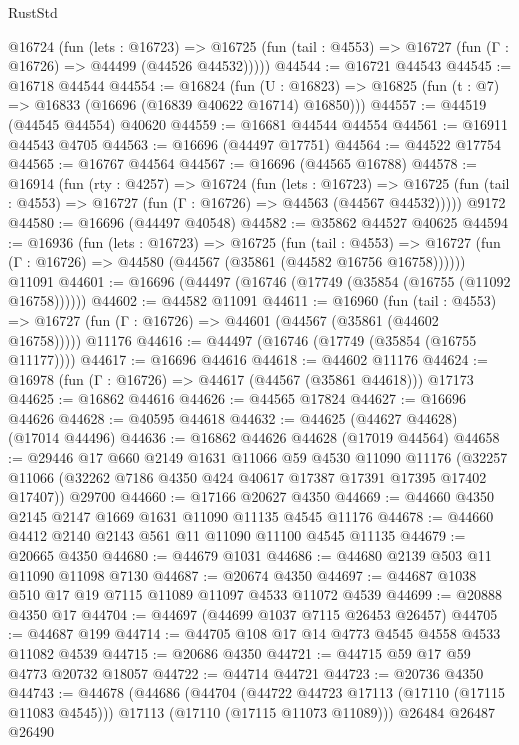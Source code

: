 \begin{lexlean}{RustStd}
\begin{coremodule}
    @16724
      (fun (lets : @16723) =>
      @16725 (fun (tail : @4553) => @16727 (fun (Γ : @16726) => @44499 (@44526 @44532)))))
@44544 := @16721 @44543
@44545 := @16718 @44544
@44554 := @16824
    (fun (U : @16823) => @16825 (fun (t : @7) => @16833 (@16696 (@16839 @40622 @16714) @16850)))
@44557 := @44519 (@44545 @44554) @40620
@44559 := @16681 @44544 @44554
@44561 := @16911 @44543 @4705
@44563 := @16696 (@44497 @17751)
@44564 := @44522 @17754
@44565 := @16767 @44564
@44567 := @16696 (@44565 @16788)
@44578 := @16914
    (fun (rty : @4257) =>
    @16724
      (fun (lets : @16723) =>
      @16725 (fun (tail : @4553) => @16727 (fun (Γ : @16726) => @44563 (@44567 @44532)))))
    @9172
@44580 := @16696 (@44497 @40548)
@44582 := @35862 @44527 @40625
@44594 := @16936
    (fun (lets : @16723) =>
    @16725
      (fun (tail : @4553) =>
      @16727 (fun (Γ : @16726) => @44580 (@44567 (@35861 (@44582 @16756 @16758))))))
    @11091
@44601 := @16696 (@44497 (@16746 (@17749 (@35854 (@16755 (@11092 @16758))))))
@44602 := @44582 @11091
@44611 := @16960
    (fun (tail : @4553) => @16727 (fun (Γ : @16726) => @44601 (@44567 (@35861 (@44602 @16758)))))
    @11176
@44616 := @44497 (@16746 (@17749 (@35854 (@16755 @11177))))
@44617 := @16696 @44616
@44618 := @44602 @11176
@44624 := @16978 (fun (Γ : @16726) => @44617 (@44567 (@35861 @44618))) @17173
@44625 := @16862 @44616
@44626 := @44565 @17824
@44627 := @16696 @44626
@44628 := @40595 @44618
@44632 := @44625 (@44627 @44628) (@17014 @44496)
@44636 := @16862 @44626 @44628 (@17019 @44564)
@44658 := @29446
    @17
    @660
    @2149
    @1631
    @11066
    @59
    @4530
    @11090
    @11176
    (@32257 @11066 (@32262 @7186 @4350 @424 @40617 @17387 @17391 @17395 @17402 @17407))
    @29700
@44660 := @17166 @20627 @4350
@44669 := @44660 @4350 @2145 @2147 @1669 @1631 @11090 @11135 @4545 @11176
@44678 := @44660 @4412 @2140 @2143 @561 @11 @11090 @11100 @4545 @11135
@44679 := @20665 @4350
@44680 := @44679 @1031
@44686 := @44680 @2139 @503 @11 @11090 @11098 @7130
@44687 := @20674 @4350
@44697 := @44687 @1038 @510 @17 @19 @7115 @11089 @11097 @4533 @11072 @4539
@44699 := @20888 @4350 @17
@44704 := @44697 (@44699 @1037 @7115 @26453 @26457)
@44705 := @44687 @199
@44714 := @44705 @108 @17 @14 @4773 @4545 @4558 @4533 @11082 @4539
@44715 := @20686 @4350
@44721 := @44715 @59 @17 @59 @4773 @20732 @18057
@44722 := @44714 @44721
@44723 := @20736 @4350
@44743 := @44678
    (@44686
      (@44704
        (@44722 @44723 @17113 (@17110 (@17115 @11083 @4545)))
        @17113
        (@17110 (@17115 @11073 @11089)))
      @26484
      @26487
      @26490

\end{coremodule}
\end{lexlean}
